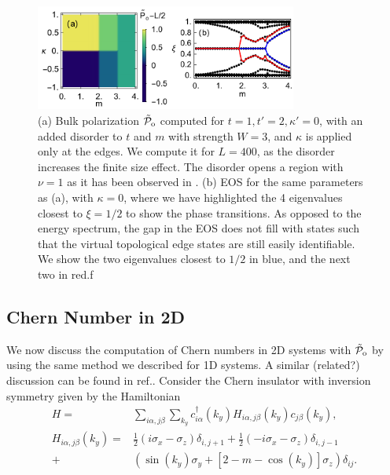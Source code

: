 \documentclass[twocolumn,amsmath,longbibliography,amssymb,superscriptaddress]{revtex4-1}
\newcommand{\tpo}{\tilde{\mathcal{P}}_{\rm o}}
\begin{document}
\begin{figure}[t]
\includegraphics[width=86mm]{fig8comp.pdf}
\caption{(a) Bulk polarization $\tpo$ computed for $t=1,t'=2,\kappa'=0$, with an added disorder to $t$ and $m$ with strength $W=3$, and $\kappa$ is applied only at the edges. We compute it for $L=400$, as the disorder increases the finite size  effect. The disorder opens a region with $\nu=1$ as it has been observed in \cite{Song2014}. (b) EOS for the same parameters as (a), with $\kappa=0$, where we have highlighted the 4 eigenvalues closest to $\xi = 1/2$ to show the phase transitions. As opposed to the energy spectrum, the gap in the EOS does not fill with states such that the virtual topological edge states are still easily identifiable. We show the two eigenvalues closest to $1/2$ in blue, and the next two in red.f }
	\label{disorder_chern}
\end{figure}

\subsection{Chern Number in 2D}

We now discuss the computation of Chern numbers in 2D systems with $\tpo$ by using the same method we described for 1D systems. A similar (related?) discussion can be found in ref.\cite{Alexandrinata2011}.
 Consider the Chern insulator with inversion symmetry given by the Hamiltonian
\begin{align}
H =& \sum_{i\alpha,j\beta}\sum_{k_y} c_{i\alpha}^\dagger(k_y) H_{i\alpha,j\beta}(k_y) c_{j\beta}(k_y), \\ \nonumber
H_{i\alpha,j\beta}(k_y)=& \frac{1}{2}(i\sigma_x-\sigma_z)\delta_{i,j+1}+\frac{1}{2}(-i\sigma_x-\sigma_z)\delta_{i,j-1} \nonumber\\
+&(\sin(k_y)\sigma_y+[2-m-\cos(k_y)]\sigma_z) \delta_{ij}.
\label{eq:chern_model}
\end{align}
\end{document}
